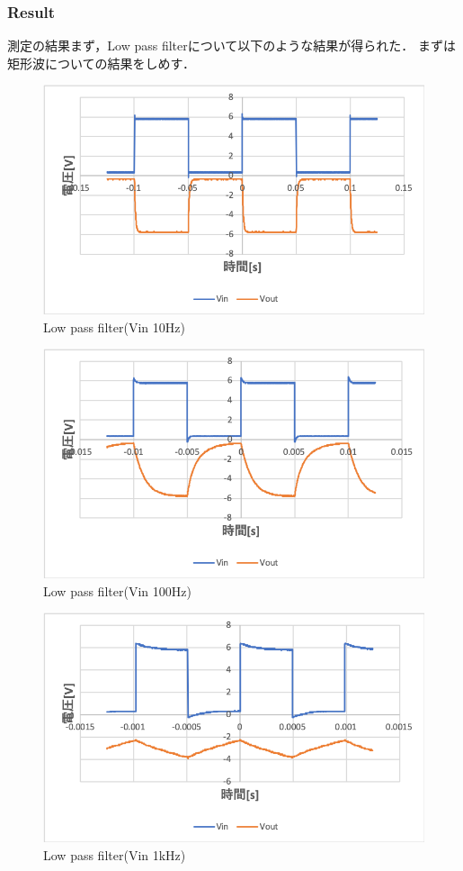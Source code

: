 \documentclass[11pt, a4paper,twocolumn]{jarticle}
\begin{document}
\subsubsection{Result}
測定の結果まず，Low pass filterについて以下のような結果が得られた．
まずは矩形波についての結果をしめす．

\begin{figure}[htbp]
 \begin{center}
  \includegraphics[width=0.8\linewidth]{fig31.png}
 \end{center}
 \caption{Low pass filter(Vin 10Hz)}
 \label{fig:31}
\end{figure}

\begin{figure}[htbp]
 \begin{center}
  \includegraphics[width=0.8\linewidth]{fig32.png}
 \end{center}
 \caption{Low pass filter(Vin 100Hz)}
 \label{fig:32}
\end{figure}

\begin{figure}[htbp]
 \begin{center}
  \includegraphics[width=0.8\linewidth]{fig33.png}
 \end{center}
 \caption{Low pass filter(Vin 1kHz)}
 \label{fig:33}
\end{figure}
\end{document}
